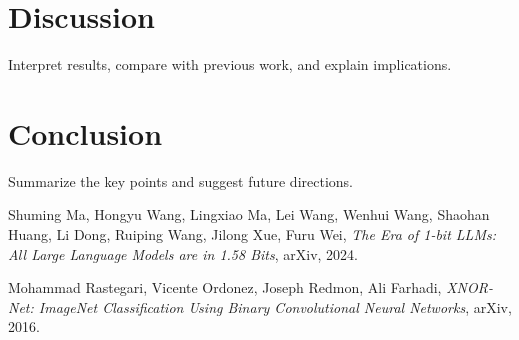 \documentclass{article}
\theoremstyle{definition}
\begin{document}
\section{Discussion}
Interpret results, compare with previous work, and explain implications.

\section{Conclusion}
Summarize the key points and suggest future directions.

\begin{thebibliography}{9}

    Shuming Ma, Hongyu Wang, Lingxiao Ma, Lei Wang, Wenhui Wang, Shaohan Huang, Li Dong, Ruiping Wang, Jilong Xue, Furu Wei, \textit{The Era of 1-bit LLMs: All Large Language Models are in 1.58 Bits}, arXiv, 2024.

    Mohammad Rastegari, Vicente Ordonez, Joseph Redmon, Ali Farhadi, \textit{XNOR-Net: ImageNet Classification Using Binary Convolutional Neural Networks}, arXiv, 2016.

\end{thebibliography}
\end{document}
